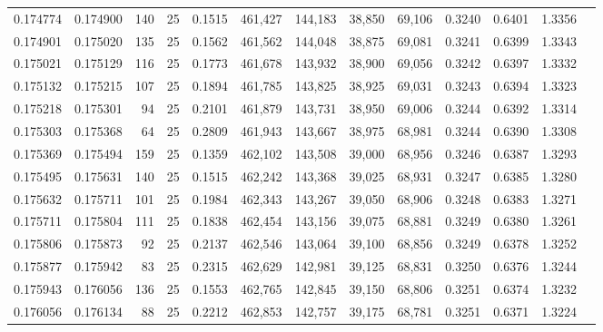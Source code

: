 \begin{tabular}{rrrrrrrrrrrrr}
0.174774 & 0.174900 &   140 &  25 &                                     0.1515 & 461,427 & 144,183 &  38,850 &  69,106 & 0.3240 & 0.6401 & 1.3356 \\
0.174901 & 0.175020 &   135 &  25 &                                     0.1562 & 461,562 & 144,048 &  38,875 &  69,081 & 0.3241 & 0.6399 & 1.3343 \\
0.175021 & 0.175129 &   116 &  25 &                                     0.1773 & 461,678 & 143,932 &  38,900 &  69,056 & 0.3242 & 0.6397 & 1.3332 \\
0.175132 & 0.175215 &   107 &  25 &                                     0.1894 & 461,785 & 143,825 &  38,925 &  69,031 & 0.3243 & 0.6394 & 1.3323 \\
0.175218 & 0.175301 &    94 &  25 &                                     0.2101 & 461,879 & 143,731 &  38,950 &  69,006 & 0.3244 & 0.6392 & 1.3314 \\
0.175303 & 0.175368 &    64 &  25 &                                     0.2809 & 461,943 & 143,667 &  38,975 &  68,981 & 0.3244 & 0.6390 & 1.3308 \\
0.175369 & 0.175494 &   159 &  25 &                                     0.1359 & 462,102 & 143,508 &  39,000 &  68,956 & 0.3246 & 0.6387 & 1.3293 \\
0.175495 & 0.175631 &   140 &  25 &                                     0.1515 & 462,242 & 143,368 &  39,025 &  68,931 & 0.3247 & 0.6385 & 1.3280 \\
0.175632 & 0.175711 &   101 &  25 &                                     0.1984 & 462,343 & 143,267 &  39,050 &  68,906 & 0.3248 & 0.6383 & 1.3271 \\
0.175711 & 0.175804 &   111 &  25 &                                     0.1838 & 462,454 & 143,156 &  39,075 &  68,881 & 0.3249 & 0.6380 & 1.3261 \\
0.175806 & 0.175873 &    92 &  25 &                                     0.2137 & 462,546 & 143,064 &  39,100 &  68,856 & 0.3249 & 0.6378 & 1.3252 \\
0.175877 & 0.175942 &    83 &  25 &                                     0.2315 & 462,629 & 142,981 &  39,125 &  68,831 & 0.3250 & 0.6376 & 1.3244 \\
0.175943 & 0.176056 &   136 &  25 &                                     0.1553 & 462,765 & 142,845 &  39,150 &  68,806 & 0.3251 & 0.6374 & 1.3232 \\
0.176056 & 0.176134 &    88 &  25 &                                     0.2212 & 462,853 & 142,757 &  39,175 &  68,781 & 0.3251 & 0.6371 & 1.3224 \\

\end{tabular}
